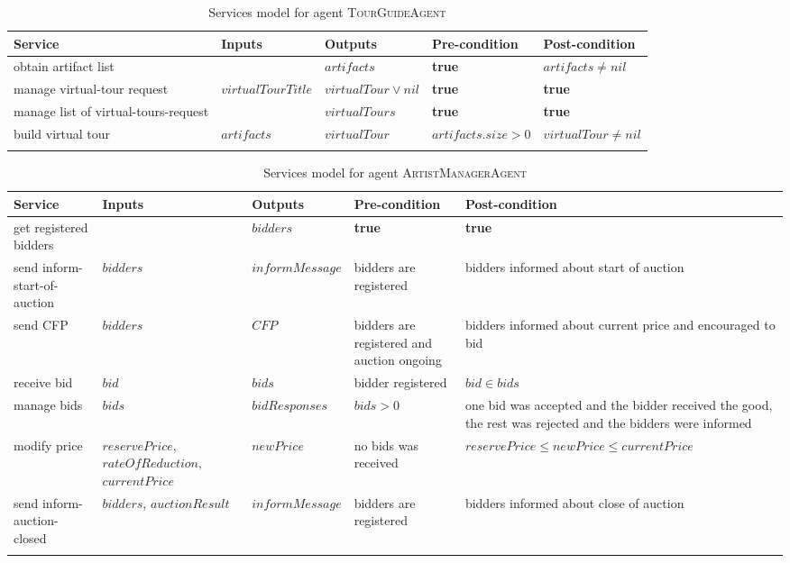 \documentclass[paper=letter, fontsize=12pt]{article}
\begin{document}
\begin {table}[H]
\caption {Services model for agent \textsc{TourGuideAgent}} \label{tab:tourguideAgent} 
\begin{center}
    \begin{tabular}{  p{3cm}  p{2.5cm}  p{2.5cm}  p{4cm}  p{4cm} }
\Xhline{4\arrayrulewidth}
    Service & Inputs & Outputs & Pre-condition & Post-condition\\ \hline
obtain artifact list & & $artifacts$ & \textbf{true} & $artifacts \neq nil$ \\
manage virtual-tour request & $virtualTourTitle$& $virtualTour \lor nil$ & \textbf{true} & \textbf{true} \\
manage list of virtual-tours-request & & $virtualTours$ & \textbf{true} & \textbf{true} \\
build virtual tour & $artifacts$ & $virtualTour$ & $artifacts.size > 0$ & $virtualTour \neq nil$ \\
\Xhline{4\arrayrulewidth}
    \end{tabular}
\end{center}
\end{table}

\begin {table}[H]
\caption {Services model for agent \textsc{ArtistManagerAgent}} \label{tab:artistmanagerAgent} 
\begin{center}
    \begin{tabular}{  p{3cm}  p{2.5cm}  p{2.5cm}  p{4cm}  p{4cm} }
\Xhline{4\arrayrulewidth}
    Service & Inputs & Outputs & Pre-condition & Post-condition\\ \hline
get registered bidders & & $bidders$ & \textbf{true} & \textbf{true}\\
send inform-start-of-auction &$bidders$ & $informMessage$ & bidders are registered & bidders informed about start of auction \\
send CFP &$bidders$ & $CFP$ & bidders are registered and auction ongoing & bidders informed about current price and encouraged to bid \\
receive bid &$bid$ & $bids$ & bidder registered  & $bid \in bids$ \\
manage bids &$bids$ & $bidResponses$ & $bids > 0$ & one bid was accepted and the bidder received the good, the rest was rejected and the bidders were informed \\
modify price &$reservePrice,$ $rateOfReduction,$ $currentPrice$ & $newPrice$& no bids was received & $reservePrice \leq newPrice \leq currentPrice$ \\
send inform-auction-closed &$bidders$, $auctionResult$ & $informMessage$ & bidders are registered & bidders informed about close of auction \\
\Xhline{4\arrayrulewidth}
    \end{tabular}
\end{center}
\end{table}
\end{document}
